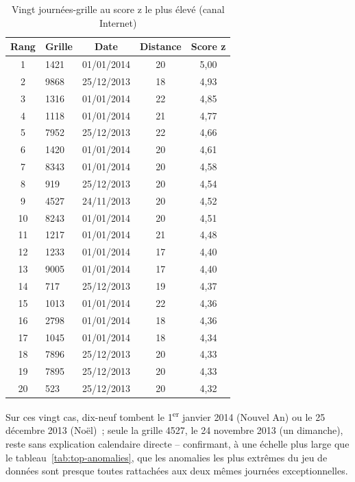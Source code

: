 \begin{table}[htbp]
  \centering
  \caption{Vingt journées-grille au score z le plus élevé (canal Internet)}
  \label{tab:top-anomalies-20}
  \begin{tabular}{clccc}
    \toprule
    \textbf{Rang} & \textbf{Grille} & \textbf{Date} & \textbf{Distance} & \textbf{Score z} \\
    \midrule
    1  & 1421 & 01/01/2014 & 20 & 5,00 \\
    2  & 9868 & 25/12/2013 & 18 & 4,93 \\
    3  & 1316 & 01/01/2014 & 22 & 4,85 \\
    4  & 1118 & 01/01/2014 & 21 & 4,77 \\
    5  & 7952 & 25/12/2013 & 22 & 4,66 \\
    6  & 1420 & 01/01/2014 & 20 & 4,61 \\
    7  & 8343 & 01/01/2014 & 20 & 4,58 \\
    8  & 919  & 25/12/2013 & 20 & 4,54 \\
    9  & 4527 & 24/11/2013 & 20 & 4,52 \\
    10 & 8243 & 01/01/2014 & 20 & 4,51 \\
    11 & 1217 & 01/01/2014 & 21 & 4,48 \\
    12 & 1233 & 01/01/2014 & 17 & 4,40 \\
    13 & 9005 & 01/01/2014 & 17 & 4,40 \\
    14 & 717  & 25/12/2013 & 19 & 4,37 \\
    15 & 1013 & 01/01/2014 & 22 & 4,36 \\
    16 & 2798 & 01/01/2014 & 18 & 4,36 \\
    17 & 1045 & 01/01/2014 & 18 & 4,34 \\
    18 & 7896 & 25/12/2013 & 20 & 4,33 \\
    19 & 7895 & 25/12/2013 & 20 & 4,33 \\
    20 & 523  & 25/12/2013 & 20 & 4,32 \\
    \bottomrule
  \end{tabular}
\end{table}

Sur ces vingt cas, dix-neuf tombent le 1\textsuperscript{er} janvier
2014 (Nouvel An) ou le 25 décembre 2013 (Noël)~; seule la grille 4527,
le 24 novembre 2013 (un dimanche), reste sans explication calendaire
directe -- confirmant, à une échelle plus large que le
tableau~\ref{tab:top-anomalies}, que les anomalies les plus extrêmes
du jeu de données sont presque toutes rattachées aux deux mêmes
journées exceptionnelles.

